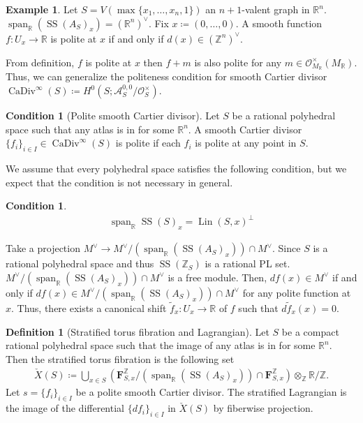 \documentclass[a4paper,dvipdfmx,reqno,12pt]{amsart}
\theoremstyle{definition}
\newtheorem{Def}[Thm]{Definition}
\newtheorem{Eg}[Thm]{Example}
\newtheorem{Cond}[Thm]{Condition}
\newcommand{\deq}{\coloneqq}
\newcommand{\R}{\mathbb{R}}%
\newcommand{\Z}{\mathbb{Z}}%
\newcommand{\mcal}[1]{\mathcal{#1}}%
\newcommand{\opn}[1]{\operatorname{#1}}
\numberwithin{equation}{section}
\begin{document}
\begin{Eg}
Let $S=V(\max\{x_1,\ldots,x_n,1\})$ an $n+1$-valent graph in $\R^{n}$.
$\opn{span}_{\R}(\opn{SS}(A_S)_x)=(\R^{n})^{\vee}$.
Fix $x\deq (0,\ldots,0)$.
A smooth function $f\colon U_x\to \R$ is polite at $x$
if and only if $d(x)\in (\Z^{n})^{\vee}$.
\end{Eg}

From definition, $f$ is polite at $x$ then $f+m$ is also polite for 
any $m\in \mcal{O}^{\times}_{M_{\R}}(M_{\R})$.  
Thus, we can generalize the politeness condition for
smooth Cartier divisor $\opn{CaDiv}^{\infty}(S)\deq H^{0}(S;\mcal{A}^{0,0}_S/\mcal{O}^{\times}_S)$.
\begin{Cond}[{Polite smooth Cartier divisor}]
Let $S$ be a rational polyhedral space such that any atlas is 
in for some $\R^{n}$. A smooth Cartier divisor 
$\{f_i\}_{i\in I}\in \opn{CaDiv}^{\infty}(S)$ is polite 
if each $f_i$ is polite at any point in $S$.
\end{Cond}

We assume that every polyhedral space satisfies 
the following condition,
but we expect that the condition is not necessary
in general.

\begin{Cond}

\begin{align}
\opn{span}_{\R}\opn{SS}(S)_x=\opn{Lin}(S,x)^{\bot}
\end{align}
\end{Cond}

Take a projection $M^{\vee}\to 
M^{\vee}/(\opn{span}_{\R}(\opn{SS}(A_S)_x))\cap M^{\vee}$.
Since $S$ is a rational polyhedral space and thus 
$\opn{SS}(\Z_S)$ is a rational PL set. 
$M^{\vee}/(\opn{span}_{\R}(\opn{SS}(A_S)_x))\cap M^{\vee}$
is a free module. 
Then, $df(x)\in M^{\vee}$ if and only if 
$df(x)\in M^{\vee}/(\opn{span}_{\R}(\opn{SS}(A_S)_x))\cap M^{\vee}$
for any polite function at $x$. Thus, there exists a canonical
shift $\tilde{f}_x\colon U_x\to \R$ of $f$ such that
$d\tilde{f}_x(x)=0$.

\begin{Def}[{Stratified torus fibration and Lagrangian}]
Let $S$ be a compact rational polyhedral space such that 
the image of any atlas is 
in for some $\R^{n}$. Then the stratified torus 
fibration is the following set
\begin{align}
\check{X}(S)\deq \bigcup_{x\in S} 
(\mathbf{F}_{S,x}^{\Z}/(\opn{span}_{\R}
(\opn{SS}(A_S)_x))\cap \mathbf{F}_{S,x}^{\Z})\otimes_{\Z} \R/\Z.
\end{align}
Let $s=\{f_i\}_{i\in I}$ be a polite smooth Cartier divisor. 
The stratified Lagrangian is the image of the differential  $\{df_i\}_{i\in I}$ in $\check{X}(S)$
by fiberwise projection.
\end{Def}
\end{document}
